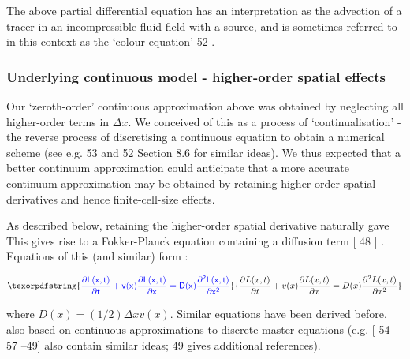 \documentclass[10pt,letterpaper]{article}
\providecommand{\DIFaddtex}[1]{{\protect\color{blue} \sf #1}} %
\providecommand{\DIFdeltex}[1]{{\protect\color{red} \scriptsize #1}} %
\providecommand{\DIFaddbegin}{} %
\providecommand{\DIFaddend}{} %
\providecommand{\DIFdelbegin}{} %
\providecommand{\DIFdelend}{} %
\providecommand{\DIFadd}[1]{\texorpdfstring{\DIFaddtex{#1}}{#1}} %
\providecommand{\DIFdel}[1]{\texorpdfstring{\DIFdeltex{#1}}{}} %
\begin{document}
\DIFdelbegin \DIFdel{The above partial differential equation has an interpretation as the
advection of a tracer in an incompressible fluid field with a source,
and is sometimes referred to in this context as the `colour equation'
}%
\DIFdel{52}%
\DIFdel{.
}%

\DIFdelend \subsubsection{Underlying continuous model - higher-order spatial
effects}\label{underlying-continuous-model---higher-order-spatial-effects}

Our `zeroth-order' continuous approximation above was obtained by
neglecting all higher-order terms in \(\Delta x\). We \DIFdelbegin \DIFdel{conceived of this
as a process of `continualisation' - the reverse process of discretising
a continuous equation to obtain a numerical scheme (see e.g. }%
\DIFdel{53}%
\DIFdel{and }%
\DIFdel{52}%
\DIFdel{Section 8.6 for similar ideas). We thus expected that a
better continuum approximation could }\DIFdelend \DIFaddbegin \DIFadd{anticipate that a
more accurate continuum approximation may }\DIFaddend be obtained by retaining
higher-order spatial derivatives and hence finite-cell-size effects.
\DIFdelbegin %

\DIFdel{As described below, retaining the higher-order spatial derivative
naturally gave }\DIFdelend \DIFaddbegin \DIFadd{This gives }\DIFaddend rise to a Fokker-Planck equation containing a diffusion term
{[}\DIFdelbegin \DIFdel{48}\DIFdelend \DIFaddbegin \DIFadd{43}\DIFaddend {]}\DIFdelbegin \DIFdel{. Equations of this (and similar) form }\DIFdelend \DIFaddbegin \DIFadd{:
}

\begin{equation}\DIFadd{\frac{\partial L(x,t)}{\partial t} + v(x)\frac{\partial L(x,t)}{\partial x} = D(x)\frac{\partial^2 L(x,t)}{\partial x^2}\label{eq:model-pde-higher-two}}\end{equation}

\DIFadd{where \(D(x) = (1/2)\Delta x v(x)\). Similar equations }\DIFaddend have been derived
before, \DIFdelbegin \DIFdel{also }\DIFdelend based on continuous approximations to discrete master equations
\DIFdelbegin \DIFdel{(e.g. }\DIFdelend {[}\DIFdelbegin \DIFdel{54--57}\DIFdelend \DIFaddbegin \DIFadd{46--49}\DIFaddend {]}\DIFdelbegin \DIFdel{also contain similar ideas; }%
\DIFdel{49}%
\DIFdel{gives
additional references). }%
\end{document}
